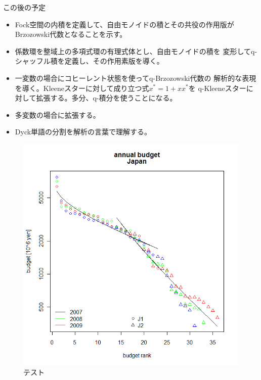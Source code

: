 {	\begin{todo}[この後の展開]\label{todo:この後の展開} %
		この後の予定
		\begin{itemize}\setlength{\itemsep}{-1mm} %
			\item Fock空間の内積を定義して、自由モノイドの積とその共役の作用版が
			Brzozowski代数となることを示す。
			\item 係数環を整域上の多項式環の有理式体とし、自由モノイドの積を
			変形してq-シャッフル積を定義し、その作用素版を導く。
			\item 一変数の場合にコヒーレント状態を使ってq-Brzozowski代数の
			解析的な表現を導く。Kleeneスターに対して成り立つ式$x^*=1+xx^*$を
			q-Kleeneスターに対して拡張する。多分、q-積分を使うことになる。
			\item 多変数の場合に拡張する。
			\item Dyck単語の分割を解析の言葉で理解する。
		\end{itemize} %
	\end{todo} %
	\begin{figure}[htbp] %
		\begin{center}
			\includegraphics[width=.96\textwidth]{fig/japan-budget.png}
		\end{center}
		\caption{テスト}\label{fig:テスト}
	\end{figure} %
}
